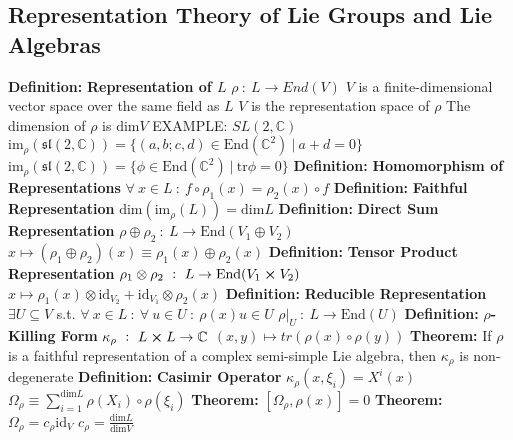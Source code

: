 \documentclass[14pt]{extarticle}
\def\Definition{{\color{blue} \textbf{Definition:} }}
\def\Theorem{{\color{red} \textbf{Theorem:} }}
\begin{document}
\begin{outline}
	\section*{Representation Theory of Lie Groups and Lie Algebras}
		\1	\Definition \textbf{Representation of $L$}
			\2	$\rho~:~L \rightarrow End(V)$
			\2	$V$ is a finite-dimensional vector space over the same field as $L$
				\3	$V$ is the representation space of $\rho$
				\3	The dimension of $\rho$ is $\text{dim} V$
			\2	EXAMPLE: $SL(2,\mathbb{C})$
				\3	$\text{im}_{\rho}(\mathfrak{sl}(2,\mathbb{C})) = 
						\{(a,b;c,d) \in \text{End}(\mathbb{C}^2)~|~a + d = 0\}$
				\3	$\text{im}_{\rho}(\mathfrak{sl}(2,\mathbb{C})) =
						\{\phi \in \text{End}(\mathbb{C}^2) ~|~\text{tr}\phi = 0\}$
		\1	\Definition \textbf{Homomorphism of Representations}
			\2	$\forall~x \in L~:~f \circ \rho_1(x) = \rho_2(x) \circ f$
		\1	\Definition \textbf{Faithful Representation}
			\2	$\text{dim}(\text{im}_{\rho}(L)) = \text{dim}L$
		\1	\Definition \textbf{Direct Sum Representation}
			\2	$\rho \oplus \rho_2~:~L \rightarrow \text{End}(V_1 \oplus V_2)$
				\3	$x \mapsto (\rho_1 \oplus \rho_2)(x) \equiv \rho_1(x) \oplus \rho_2(x)$
		\1	\Definition \textbf{Tensor Product Representation}
			\2	$\rho_1 \otimes \rho_2~:~L \rightarrow \text{End}(V_1 \cross V_2)$
				\3	$x \mapsto \rho_1(x) \otimes \text{id}_{V_2} + \text{id}_{V_1} \otimes \rho_2(x)$
		\1	\Definition \textbf{Reducible Representation}
			\2	$\exists U \subseteq V$ s.t. $\forall~x \in L~:~\forall~u \in U~:~\rho(x)u \in U$
			\2	$\rho|_U~:~L \rightarrow \text{End}(U)$
		\1	\Definition \textbf{$\rho$-Killing Form}
			\2	$\kappa_{\rho}~:~L \cross L \rightarrow \mathbb{C}$
			\2	$(x,y) \mapsto tr(\rho(x) \circ \rho(y))$
		\1 \Theorem If $\rho$ is a faithful representation of a complex semi-simple
				Lie algebra, then $\kappa_{\rho}$ is non-degenerate
		\1	\Definition \textbf{Casimir Operator}
			\2	$\kappa_{\rho}(x,\xi_i) = X^i(x)$
			\2	$\Omega_{\rho} \equiv \sum_{i=1}^{\text{dim} L} \rho(X_i) \circ \rho(\xi_i)$
		\1	\Theorem $[\Omega_{\rho},\rho(x)] = 0$
		\1	\Theorem $\Omega_{\rho} = c_{\rho} \text{id}_V$
			\2	$c_{\rho} = \frac{\text{dim}L}{\text{dim}V}$

\end{outline}
\end{document}
